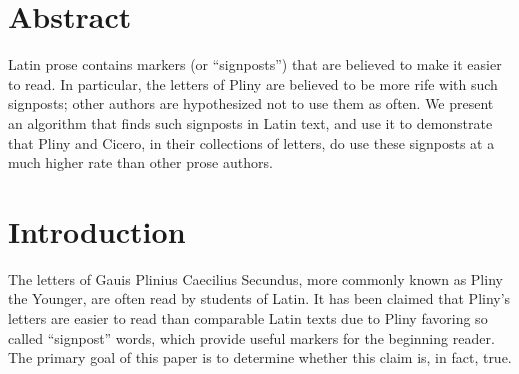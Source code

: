 \iffalse
(*
 * Copyright (c) 2015, 
 *  Martin Kellogg          <mjk6zt@cs.virginia.edu>
 * All rights reserved.
 * 
 * Redistribution and use in source and binary forms, with or without
 * modification, are permitted provided that the following conditions are
 * met:
 *
 * 1. Redistributions of source code must retain the above copyright
 * notice, this list of conditions and the following disclaimer.
 *
 * 2. Redistributions in binary form must reproduce the above copyright
 * notice, this list of conditions and the following disclaimer in the
 * documentation and/or other materials provided with the distribution.
 *
 * 3. The names of the contributors may not be used to endorse or promote
 * products derived from this software without specific prior written
 * permission.
 *
 * THIS SOFTWARE IS PROVIDED BY THE COPYRIGHT HOLDERS AND CONTRIBUTORS "AS
 * IS" AND ANY EXPRESS OR IMPLIED WARRANTIES, INCLUDING, BUT NOT LIMITED
 * TO, THE IMPLIED WARRANTIES OF MERCHANTABILITY AND FITNESS FOR A
 * PARTICULAR PURPOSE ARE DISCLAIMED. IN NO EVENT SHALL THE COPYRIGHT OWNER
 * OR CONTRIBUTORS BE LIABLE FOR ANY DIRECT, INDIRECT, INCIDENTAL, SPECIAL,
 * EXEMPLARY, OR CONSEQUENTIAL DAMAGES (INCLUDING, BUT NOT LIMITED TO,
 * PROCUREMENT OF SUBSTITUTE GOODS OR SERVICES; LOSS OF USE, DATA, OR
 * PROFITS; OR BUSINESS INTERRUPTION) HOWEVER CAUSED AND ON ANY THEORY OF
 * LIABILITY, WHETHER IN CONTRACT, STRICT LIABILITY, OR TORT (INCLUDING
 * NEGLIGENCE OR OTHERWISE) ARISING IN ANY WAY OUT OF THE USE OF THIS
 * SOFTWARE, EVEN IF ADVISED OF THE POSSIBILITY OF SUCH DAMAGE.
 *)
\fi

\section{Abstract}

Latin prose contains markers (or ``signposts'') that are believed to make it easier to read. In particular, the letters of Pliny are believed to be more rife with such signposts; other authors are hypothesized not to use them as often. We present an algorithm that finds such signposts in Latin text, and use it to demonstrate that Pliny and Cicero, in their collections of letters, do use these signposts at a much higher rate than other prose authors.    

\section{Introduction}
\label{sec:Intro}

The letters of Gauis Plinius Caecilius Secundus, more commonly known as Pliny the Younger, are often read by students of Latin.  It has been claimed \cite{Woodmanpm} that Pliny's letters are easier to read than comparable Latin texts due to Pliny favoring so called ``signpost'' words, which provide useful markers for the beginning reader. The primary goal of this paper is to determine whether this claim is, in fact, true.

